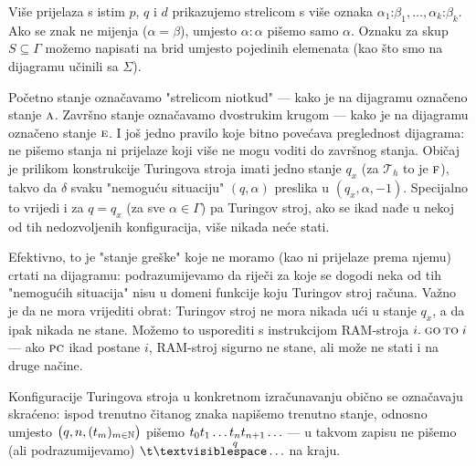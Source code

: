 \begin{primjer}[{name=[funkcija koja riječi parne duljine preslikava u prvu polovicu]}]
Više prijelaza s istim $p$, $q$ i $d$ prikazujemo strelicom s više oznaka $\alpha_1\mathord:\beta_1,\dotsc,\alpha_k\mathord:\beta_k$. Ako se znak ne mijenja ($\alpha=\beta$), umjesto $\alpha\!:\!\alpha$ pišemo samo $\alpha$. Oznaku za skup $S\subseteq\Gamma$ možemo napisati na brid umjesto pojedinih elemenata (kao što smo na dijagramu učinili sa $\Sigma$).

    Početno stanje označavamo "strelicom niotkud" --- kako je na dijagramu označeno stanje $\textsc a$. Završno stanje označavamo dvostrukim krugom --- kako je na dijagramu označeno stanje $\textsc e$. I još jedno pravilo koje bitno povećava preglednost dijagrama: ne pišemo stanja ni prijelaze koji više ne mogu voditi do završnog stanja. Običaj je prilikom konstrukcije Turingova stroja imati jedno stanje $q_x$ (za $\mathcal T_h$ to je $\textsc f$), takvo da $\delta$ svaku "nemoguću situaciju" $(q,\alpha)$ preslika u $(q_x,\alpha,-1)$. Specijalno to vrijedi i za $q=q_x$ (za sve $\alpha\in\Gamma$) pa Turingov stroj, ako se ikad nađe u nekoj od tih nedozvoljenih konfiguracija, više nikada neće stati.

    Efektivno, to je "stanje greške" koje ne moramo (kao ni prijelaze prema njemu) crtati na dijagramu: podrazumijevamo da riječi za koje se dogodi neka od tih "nemogućih situacija" nisu u domeni funkcije koju Turingov stroj računa. Važno je da ne mora vrijediti obrat: Turingov stroj ne mora nikada ući u stanje $q_x$, a da ipak nikada ne stane. Možemo to usporediti s instrukcijom RAM-stroja $i.\;\textsc{go\,to}\;i$ --- ako $\textsc{pc}$ ikad postane $i$, RAM-stroj sigurno ne stane, ali može ne stati i na druge načine.

    Konfiguracije Turingova stroja u konkretnom izračunavanju obično se označavaju skraćeno: ispod trenutno čitanog znaka napišemo trenutno stanje, odnosno umjesto $\bigl(q,n,(t_m)_{m\in{\mathbb N}}\bigr)$ pišemo $t_0t_1\ldots\smash{\underset{q}{t_n}}t_{n+1}\ldots$ --- u takvom zapisu ne pišemo (ali podrazumijevamo) $\bl\ldots$ na kraju.


\end{primjer}
